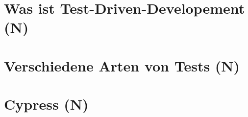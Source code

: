\section{Was ist Test-Driven-Developement (N)}


\section{Verschiedene Arten von Tests (N)}


\section{Cypress (N)}
